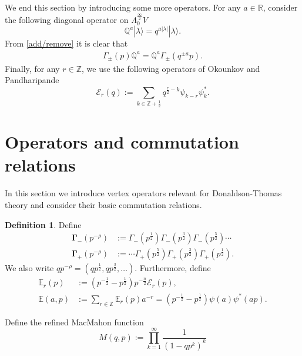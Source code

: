 \documentclass{amsart}
\theoremstyle{definition}
\newtheorem{definition}[theorem]{Definition}
\newcommand{\RR} {\mathbb{R}}		%
\newcommand{\ZZ} {\mathbb{Z}}		%
\newcommand{\QQ} {\mathbb{Q}}		%
\newcommand{\E}{\mathcal{E}}
\newcommand{\EE}{\mathbb{E}}
\begin{document}
We end this section by introducing some more operators. For any $a \in \RR$, consider the following diagonal operator on $\Lambda^{\frac{\infty}{2}}_{0} V$ 
$$
\QQ^a |\lambda\rangle = q^{a|\lambda|} |\lambda\rangle.
$$
From \eqref{add/remove} it is clear that
\begin{align} \label{gammaQ}
\Gamma_{\pm}(p) \QQ^a = \QQ^a \Gamma_{\pm}(q^{\pm a} p).
\end{align}
Finally, for any $r \in \ZZ$, we use the following operators of Okounkov and Pandharipande \cite{OP}
$$
\E_r(q) := \sum_{k \in \ZZ + \frac{1}{2}} q^{\frac{r}{2} - k} \psi_{k-r} \psi_{k}^{*}.
$$  


\section{Operators and commutation relations}

In this section we introduce vertex operators relevant for Donaldson-Thomas theory and consider their basic commutation relations.

\begin{definition} 
Define
\begin{align*}
\mathbf{\Gamma}_{-}(p^{-\rho}) &:= \Gamma_{-}(p^{\frac{1}{2}}) \Gamma_{-}(p^{\frac{3}{2}}) \Gamma_{-}(p^{\frac{5}{2}}) \cdots \\
\mathbf{\Gamma}_{+}(p^{-\rho}) &:=  \cdots \Gamma_{+}(p^{\frac{5}{2}}) \Gamma_{+}(p^{\frac{3}{2}}) \Gamma_{+}(p^{\frac{1}{2}}).
\end{align*}
We also write $q p^{-\rho} = (q p^{\frac{1}{2}}, q p^{\frac{3}{2}},  \ldots)$. Furthermore, define
\begin{align*}
\EE_r(p) &:=(p^{-\frac{1}{2}} - p^{\frac{1}{2}}) p^{-\frac{n}{2}} \E_r(p), \\
\EE(a,p) &:=\sum_{r \in \ZZ} \EE_r(p) a^{-r} = (p^{-\frac{1}{2}} - p^{\frac{1}{2}}) \psi(a) \psi^*(a p).
\end{align*}
\end{definition}

Define the refined MacMahon function
$$
M(q,p) := \prod_{k=1}^{\infty} \frac{1}{(1-q p^k)^k}
$$
\end{document}
